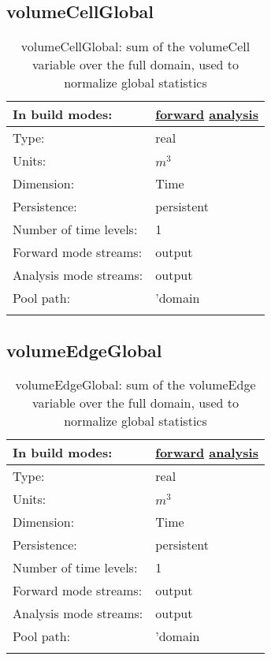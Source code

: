 \subsection[volumeCellGlobal]{volumeCellGlobal}
\label{subsec:var_sec_diagnostics_volumeCellGlobal}
\begin{center}
\begin{longtable}{| p{2.0in} | p{4.0in} |}
        \hline 
        In build modes: & \hyperref[subsec:forward_var_tab_diagnostics]{forward} \hyperref[subsec:analysis_var_tab_diagnostics]{analysis} \\
        \hline 
        Type: & real \\
        \hline 
        Units: & $m^3$ \\
        \hline 
        Dimension: & Time \\
        \hline 
        Persistence: & persistent \\
        \hline 
        Number of time levels: & 1 \\
        \hline 
		 Forward mode streams: &  output \\
        \hline 
		 Analysis mode streams: &  output \\
        \hline 
            Pool path: & 'domain %
 \\
		 \hline 
    \caption{volumeCellGlobal: sum of the volumeCell variable over the full domain, used to normalize global statistics}
\end{longtable}
\end{center}
\subsection[volumeEdgeGlobal]{volumeEdgeGlobal}
\label{subsec:var_sec_diagnostics_volumeEdgeGlobal}
\begin{center}
\begin{longtable}{| p{2.0in} | p{4.0in} |}
        \hline 
        In build modes: & \hyperref[subsec:forward_var_tab_diagnostics]{forward} \hyperref[subsec:analysis_var_tab_diagnostics]{analysis} \\
        \hline 
        Type: & real \\
        \hline 
        Units: & $m^3$ \\
        \hline 
        Dimension: & Time \\
        \hline 
        Persistence: & persistent \\
        \hline 
        Number of time levels: & 1 \\
        \hline 
		 Forward mode streams: &  output \\
        \hline 
		 Analysis mode streams: &  output \\
        \hline 
            Pool path: & 'domain %
 \\
		 \hline 
    \caption{volumeEdgeGlobal: sum of the volumeEdge variable over the full domain, used to normalize global statistics}
\end{longtable}
\end{center}
